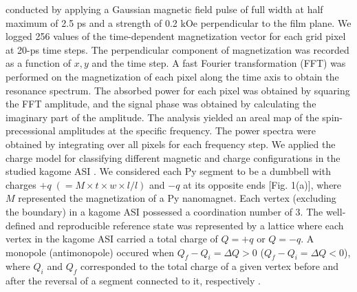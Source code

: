 \documentclass[aps,prl,preprint,showpacs,superscriptaddress,groupedaddress]{revtex4}%
\begin{document}
conducted by applying a Gaussian magnetic field pulse of full width at half maximum of 2.5 ps and a strength of 0.2 kOe perpendicular to the film plane. We logged 256 values of the time-dependent magnetization vector for each grid pixel at 20-ps time steps. The perpendicular component of magnetization was recorded as a function of $x, y$ and the time step. A fast Fourier transformation (FFT) was performed on the magnetization of each pixel along the time axis to obtain the resonance spectrum. The absorbed power for each pixel was obtained by squaring the FFT amplitude, and the signal phase was obtained by calculating the imaginary part of the amplitude. The analysis yielded an areal map of the spin-precessional amplitudes at the specific frequency. The power spectra were obtained by integrating over all pixels for each frequency step. We applied the charge model for classifying  different magnetic and charge configurations in the studied kagome ASI \cite{castelnovo2008magnetic,mellado2010dynamics,mengotti2011real}. We considered each Py segment to be a dumbbell with charges $+q\; (= M \times t \times w \times l/l)$ and $-q $ at its opposite ends  [Fig. 1(a)], where $ M $ represented the magnetization of a Py nanomagnet. Each vertex (excluding the boundary) in a kagome ASI possessed a coordination number of $ 3 $. The well-defined and reproducible reference state was represented by a lattice where each vertex in the kagome ASI carried a total charge of $Q = +q$ or $Q = -q$. A monopole (antimonopole) occured when $Q_{f} - Q_{i} = \Delta Q > 0 $ ($Q_{f} - Q_{i} = \Delta Q < 0 $), where $ Q_{i}$ and $Q_{f} $ corresponded to the total charge of a given vertex before and after the reversal of a segment connected to it, respectively \cite{mellado2010dynamics,mengotti2011real}.  
\end{document}
